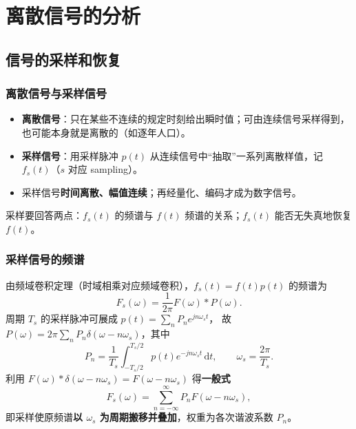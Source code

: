 \chapter{离散信号的分析}
\providecommand{\Saa}{\operatorname{Sa}}

\section{信号的采样和恢复}

\subsection{离散信号与采样信号}

\begin{itemize}
\item \textbf{离散信号}：只在某些不连续的规定时刻给出瞬时值；可由连续信号采样得到，也可能本身就是离散的（如逐年人口）。
\item \textbf{采样信号}：用采样脉冲 $p(t)$ 从连续信号中“抽取”一系列离散样值，记 $f_s(t)$（$s$ 对应 sampling）。
\item 采样信号\textbf{时间离散、幅值连续}；再经量化、编码才成为数字信号。
\end{itemize}
采样要回答两点：$f_s(t)$ 的频谱与 $f(t)$ 频谱的关系；$f_s(t)$ 能否无失真地恢复 $f(t)$。

\subsection{采样信号的频谱}

由频域卷积定理（时域相乘对应频域卷积），$f_s(t)=f(t)p(t)$ 的频谱为
\begin{equation}
F_s(\omega)=\frac{1}{2\pi}F(\omega)*P(\omega).
\end{equation}
周期 $T_s$ 的采样脉冲可展成 $p(t)=\sum_n P_n e^{jn\omega_s t}$，
故 $P(\omega)=2\pi\sum_n P_n\delta(\omega-n\omega_s)$，其中
\begin{equation}
P_n=\frac{1}{T_s}\int_{-T_s/2}^{T_s/2}p(t)e^{-jn\omega_s t}\,\mathrm{d}t,
\qquad \omega_s=\frac{2\pi}{T_s}.
\end{equation}
利用 $F(\omega)*\delta(\omega-n\omega_s)=F(\omega-n\omega_s)$ 得\textbf{一般式}
\begin{equation}
F_s(\omega)=\sum_{n=-\infty}^{\infty}P_n F(\omega-n\omega_s),
\end{equation}
即采样使原频谱\textbf{以 $\omega_s$ 为周期搬移并叠加}，权重为各次谐波系数 $P_n$。

